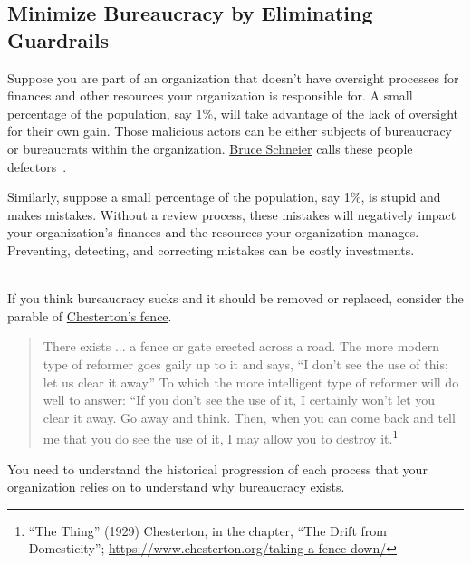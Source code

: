 \subsection*{Minimize Bureaucracy by Eliminating Guardrails}

Suppose  you are part of an organization that doesn't have oversight processes for finances and other resources your organization is responsible for. A small percentage of the population, say 1\%, will take advantage of the lack of oversight for their own gain. Those malicious actors can be either subjects of bureaucracy or bureaucrats within the organization. 
\href{https://en.wikipedia.org/wiki/Bruce_Schneier}{Bruce Schneier}
calls these people defectors~\cite{2012_Schneier}.

Similarly, suppose a small percentage of the population, say 1\%, is stupid and makes mistakes. Without a review process, these mistakes will negatively impact your organization's finances and the resources your organization manages. Preventing, detecting, and correcting mistakes can be costly investments. 

\ \\

If you think bureaucracy sucks and it should be removed or replaced,  consider the parable of \href{https://en.wikipedia.org/wiki/G._K._Chesterton#Chesterton's_fence}{Chesterton's fence}. 
\begin{quote}
There exists ... a fence or gate erected across a road. The more modern type of reformer goes gaily up to it and says, “I don’t see the use of this; let us clear it away.” To which the more intelligent type of reformer will do well to answer: “If you don’t see the use of it, I certainly won’t let you clear it away. Go away and think. Then, when you can come back and tell me that you do see the use of it, I may allow you to destroy it.\footnote{``The Thing'' (1929) Chesterton, in the chapter, ``The Drift from Domesticity''; \href{https://www.chesterton.org/taking-a-fence-down/}{https://www.chesterton.org/taking-a-fence-down/}}
\end{quote}
You need to understand the historical progression of each process that your organization relies on to understand why bureaucracy exists.

